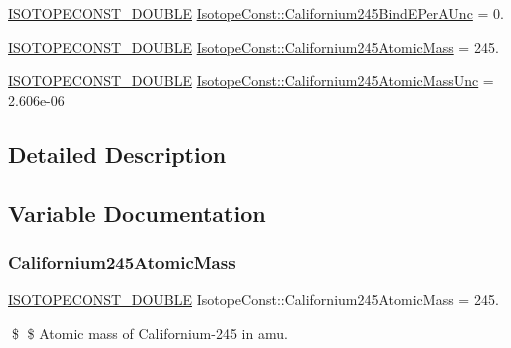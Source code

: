 \begin{DoxyCompactItemize}
\item 
\mbox{\hyperlink{group___isotope_const-_macros_ga8f45a7272ce02c0b4c65c44636ed719a}{I\+S\+O\+T\+O\+P\+E\+C\+O\+N\+S\+T\+\_\+\+D\+O\+U\+B\+LE}} \mbox{\hyperlink{group___isotope_const-_californium-_cf245_ga281398adc5c01a2be0d0a1b870d81b86}{Isotope\+Const\+::\+Californium245\+Bind\+E\+Per\+A\+Unc}} = 0.
\item 
\mbox{\hyperlink{group___isotope_const-_macros_ga8f45a7272ce02c0b4c65c44636ed719a}{I\+S\+O\+T\+O\+P\+E\+C\+O\+N\+S\+T\+\_\+\+D\+O\+U\+B\+LE}} \mbox{\hyperlink{group___isotope_const-_californium-_cf245_ga1a8c07350a9558b33e5d2a73b91d63e8}{Isotope\+Const\+::\+Californium245\+Atomic\+Mass}} = 245.
\item 
\mbox{\hyperlink{group___isotope_const-_macros_ga8f45a7272ce02c0b4c65c44636ed719a}{I\+S\+O\+T\+O\+P\+E\+C\+O\+N\+S\+T\+\_\+\+D\+O\+U\+B\+LE}} \mbox{\hyperlink{group___isotope_const-_californium-_cf245_gaca814a9c97a7de17d4ae7d28883186ae}{Isotope\+Const\+::\+Californium245\+Atomic\+Mass\+Unc}} = 2.\+606e-\/06
\end{DoxyCompactItemize}


\subsection{Detailed Description}


\subsection{Variable Documentation}
\mbox{\label{group___isotope_const-_californium-_cf245_ga1a8c07350a9558b33e5d2a73b91d63e8}} 
\subsubsection{\texorpdfstring{Californium245\+Atomic\+Mass}{Californium245AtomicMass}}
{\footnotesize\ttfamily \mbox{\hyperlink{group___isotope_const-_macros_ga8f45a7272ce02c0b4c65c44636ed719a}{I\+S\+O\+T\+O\+P\+E\+C\+O\+N\+S\+T\+\_\+\+D\+O\+U\+B\+LE}} Isotope\+Const\+::\+Californium245\+Atomic\+Mass = 245.}

\$ \$ Atomic mass of Californium-\/245 in amu. \mbox{\label{group___isotope_const-_californium-_cf245_gaca814a9c97a7de17d4ae7d28883186ae}} 
